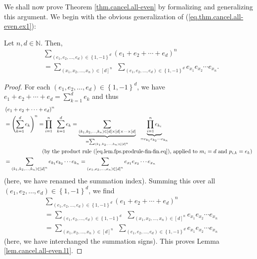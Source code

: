 We shall now prove Theorem \ref{thm.cancel.all-even} by formalizing and
generalizing this argument. We begin with the obvious generalization of
(\ref{eq.thm.cancel.all-even.ex1}):

\begin{lemma}
\label{lem.cancel.all-even.l1}Let $n,d\in\mathbb{N}$. Then,%
\begin{align*}
&  \sum_{\left(  e_{1},e_{2},\ldots,e_{d}\right)  \in\left\{  1,-1\right\}
^{d}}\left(  e_{1}+e_{2}+\cdots+e_{d}\right)  ^{n}\\
&  =\sum_{\left(  x_{1},x_{2},\ldots,x_{n}\right)  \in\left[  d\right]  ^{n}%
}\ \ \sum_{\left(  e_{1},e_{2},\ldots,e_{d}\right)  \in\left\{  1,-1\right\}
^{d}}e_{x_{1}}e_{x_{2}}\cdots e_{x_{n}}.
\end{align*}

\end{lemma}

\begin{proof}
For each $\left(  e_{1},e_{2},\ldots,e_{d}\right)  \in\left\{  1,-1\right\}
^{d}$, we have $e_{1}+e_{2}+\cdots+e_{d}=\sum_{k=1}^{d}e_{k}$ and thus%
\begin{align*}
&  \left(  e_{1}+e_{2}+\cdots+e_{d}\right)  ^{n}\\
&  =\left(  \sum_{k=1}^{d}e_{k}\right)  ^{n}=\prod_{i=1}^{n}\ \ \sum_{k=1}%
^{d}e_{k}=\underbrace{\sum_{\left(  k_{1},k_{2},\ldots,k_{n}\right)
\in\left[  d\right]  \times\left[  d\right]  \times\cdots\times\left[
d\right]  }}_{=\sum_{\left(  k_{1},k_{2},\ldots,k_{n}\right)  \in\left[
d\right]  ^{n}}}\ \ \underbrace{\prod_{i=1}^{n}e_{k_{i}}}_{=e_{k_{1}}e_{k_{2}%
}\cdots e_{k_{n}}}\\
&  \ \ \ \ \ \ \ \ \ \ \ \ \ \ \ \ \ \ \ \ \left(  \text{by the product rule
(\ref{eq.lem.fps.prodrule-fin-fin.eq}), applied to }m_{i}=d\text{ and }%
p_{i,k}=e_{k}\right) \\
&  =\sum_{\left(  k_{1},k_{2},\ldots,k_{n}\right)  \in\left[  d\right]  ^{n}%
}e_{k_{1}}e_{k_{2}}\cdots e_{k_{n}}=\sum_{\left(  x_{1},x_{2},\ldots
,x_{n}\right)  \in\left[  d\right]  ^{n}}e_{x_{1}}e_{x_{2}}\cdots e_{x_{n}}%
\end{align*}
(here, we have renamed the summation index). Summing this over all $\left(
e_{1},e_{2},\ldots,e_{d}\right)  \in\left\{  1,-1\right\}  ^{d}$, we find%
\begin{align*}
&  \sum_{\left(  e_{1},e_{2},\ldots,e_{d}\right)  \in\left\{  1,-1\right\}
^{d}}\left(  e_{1}+e_{2}+\cdots+e_{d}\right)  ^{n}\\
&  =\sum_{\left(  e_{1},e_{2},\ldots,e_{d}\right)  \in\left\{  1,-1\right\}
^{d}}\ \ \sum_{\left(  x_{1},x_{2},\ldots,x_{n}\right)  \in\left[  d\right]
^{n}}e_{x_{1}}e_{x_{2}}\cdots e_{x_{n}}\\
&  =\sum_{\left(  x_{1},x_{2},\ldots,x_{n}\right)  \in\left[  d\right]  ^{n}%
}\ \ \sum_{\left(  e_{1},e_{2},\ldots,e_{d}\right)  \in\left\{  1,-1\right\}
^{d}}e_{x_{1}}e_{x_{2}}\cdots e_{x_{n}}%
\end{align*}
(here, we have interchanged the summation signs). This proves Lemma
\ref{lem.cancel.all-even.l1}.
\end{proof}

